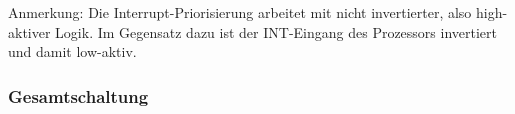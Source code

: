 Anmerkung: Die Interrupt-Priorisierung arbeitet mit nicht invertierter, also high-aktiver Logik. Im Gegensatz dazu ist der INT-Eingang des Prozessors invertiert und damit low-aktiv.

\subsubsection{Gesamtschaltung}
\begin{figure}[H]
    \centering
    \qquad
    \qquad
\end{figure}
